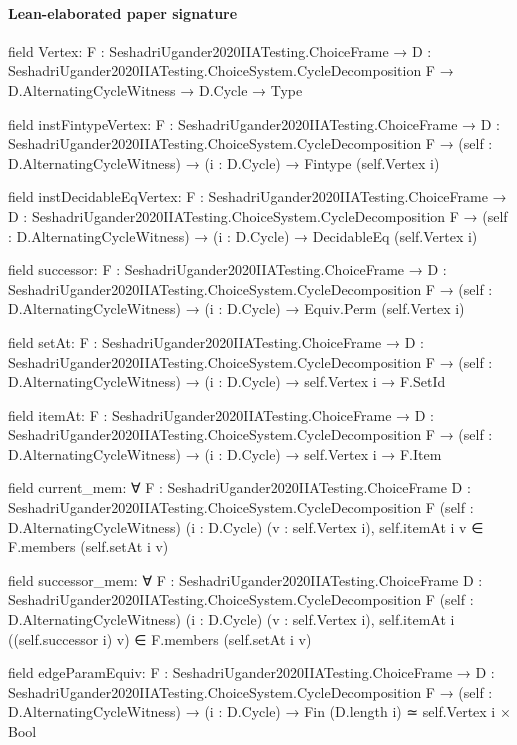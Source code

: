 \documentclass[10pt]{article}
\begin{document}
\paragraph{Lean-elaborated paper signature}
\begin{ReviewVerbatim}
field Vertex:
{F : SeshadriUgander2020IIATesting.ChoiceFrame} →
  {D : SeshadriUgander2020IIATesting.ChoiceSystem.CycleDecomposition F} → D.AlternatingCycleWitness → D.Cycle → Type

field instFintypeVertex:
{F : SeshadriUgander2020IIATesting.ChoiceFrame} →
  {D : SeshadriUgander2020IIATesting.ChoiceSystem.CycleDecomposition F} →
    (self : D.AlternatingCycleWitness) → (i : D.Cycle) → Fintype (self.Vertex i)

field instDecidableEqVertex:
{F : SeshadriUgander2020IIATesting.ChoiceFrame} →
  {D : SeshadriUgander2020IIATesting.ChoiceSystem.CycleDecomposition F} →
    (self : D.AlternatingCycleWitness) → (i : D.Cycle) → DecidableEq (self.Vertex i)

field successor:
{F : SeshadriUgander2020IIATesting.ChoiceFrame} →
  {D : SeshadriUgander2020IIATesting.ChoiceSystem.CycleDecomposition F} →
    (self : D.AlternatingCycleWitness) → (i : D.Cycle) → Equiv.Perm (self.Vertex i)

field setAt:
{F : SeshadriUgander2020IIATesting.ChoiceFrame} →
  {D : SeshadriUgander2020IIATesting.ChoiceSystem.CycleDecomposition F} →
    (self : D.AlternatingCycleWitness) → (i : D.Cycle) → self.Vertex i → F.SetId

field itemAt:
{F : SeshadriUgander2020IIATesting.ChoiceFrame} →
  {D : SeshadriUgander2020IIATesting.ChoiceSystem.CycleDecomposition F} →
    (self : D.AlternatingCycleWitness) → (i : D.Cycle) → self.Vertex i → F.Item

field current_mem:
∀ {F : SeshadriUgander2020IIATesting.ChoiceFrame} {D : SeshadriUgander2020IIATesting.ChoiceSystem.CycleDecomposition F}
  (self : D.AlternatingCycleWitness) (i : D.Cycle) (v : self.Vertex i), self.itemAt i v ∈ F.members (self.setAt i v)

field successor_mem:
∀ {F : SeshadriUgander2020IIATesting.ChoiceFrame} {D : SeshadriUgander2020IIATesting.ChoiceSystem.CycleDecomposition F}
  (self : D.AlternatingCycleWitness) (i : D.Cycle) (v : self.Vertex i),
  self.itemAt i ((self.successor i) v) ∈ F.members (self.setAt i v)

field edgeParamEquiv:
{F : SeshadriUgander2020IIATesting.ChoiceFrame} →
  {D : SeshadriUgander2020IIATesting.ChoiceSystem.CycleDecomposition F} →
    (self : D.AlternatingCycleWitness) → (i : D.Cycle) → Fin (D.length i) ≃ self.Vertex i × Bool


\end{ReviewVerbatim}
\end{document}
